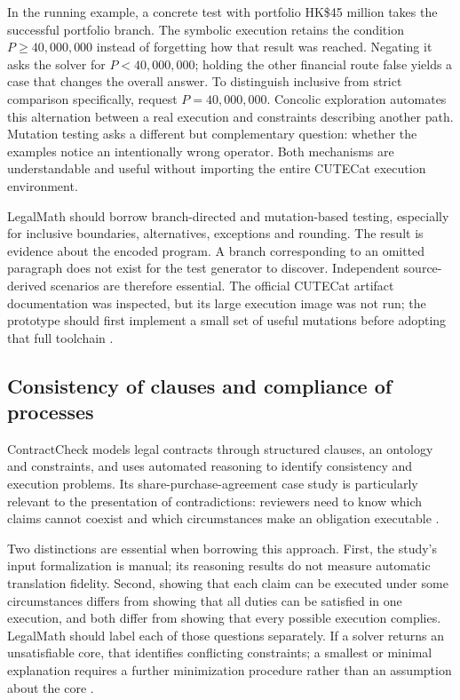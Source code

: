 In the running example, a concrete test with portfolio HK\$45 million takes
the successful portfolio branch. The symbolic execution retains the condition
$P\geq 40{,}000{,}000$ instead of forgetting how that result was reached.
Negating it asks the solver for $P<40{,}000{,}000$; holding the other financial
route false yields a case that changes the overall answer. To distinguish
inclusive from strict comparison specifically, request $P=40{,}000{,}000$.
Concolic exploration automates this alternation between a real execution and
constraints describing another path. Mutation testing asks a different but
complementary question: whether the examples notice an intentionally wrong
operator. Both mechanisms are understandable and useful without importing
the entire CUTECat execution environment.

LegalMath should borrow branch-directed and mutation-based testing, especially
for inclusive boundaries, alternatives, exceptions and rounding. The result is
evidence about the encoded program. A branch corresponding to an omitted
paragraph does not exist for the test generator to discover. Independent
source-derived scenarios are therefore essential. The official CUTECat artifact
documentation was inspected, but its large execution image was not run; the
prototype should first implement a small set of useful mutations before adopting
that full toolchain \citep{libraryreview}.

\subsection{Consistency of clauses and compliance of processes}
\label{merge:P-02-literature:06}


ContractCheck models legal contracts through structured clauses, an ontology and
constraints, and uses automated reasoning to identify consistency and execution
problems. Its share-purchase-agreement case study is particularly relevant to
the presentation of contradictions: reviewers need to know which claims cannot
coexist and which circumstances make an obligation executable
\citep[secs.~3--7]{contractcheck2025}.

Two distinctions are essential when borrowing this approach. First, the study's
input formalization is manual; its reasoning results do not measure automatic
translation fidelity. Second, showing that each claim can be executed under
some circumstances differs from showing that all duties can be satisfied in one
execution, and both differ from showing that every possible execution complies.
LegalMath should label each of those questions separately. If a solver returns
an unsatisfiable core, that identifies conflicting constraints; a smallest or
minimal explanation requires a further minimization procedure rather than an
assumption about the core \citep[secs.~4--5, 8]{contractcheck2025}.


